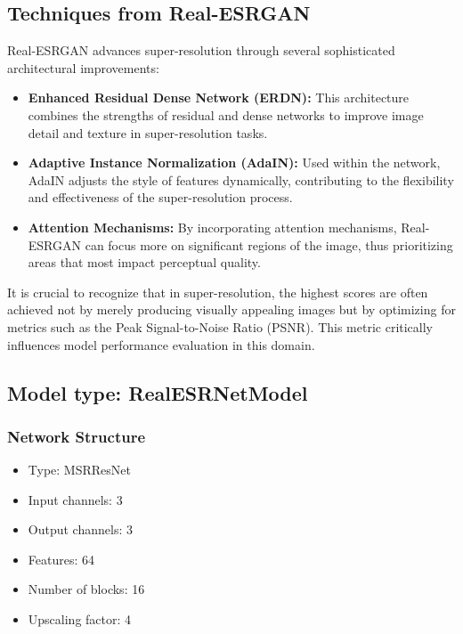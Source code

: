 \documentclass{article}
\begin{document}
\subsection{Techniques from Real-ESRGAN}
\label{subsec:Real-ESRGAN}%

Real-ESRGAN advances super-resolution through several sophisticated architectural improvements:

\begin{itemize}
    \item \textbf{Enhanced Residual Dense Network (ERDN):} This architecture combines the strengths of residual and dense networks to improve image detail and texture in super-resolution tasks.
    \item \textbf{Adaptive Instance Normalization (AdaIN):} Used within the network, AdaIN adjusts the style of features dynamically, contributing to the flexibility and effectiveness of the super-resolution process.
    \item \textbf{Attention Mechanisms:} By incorporating attention mechanisms, Real-ESRGAN can focus more on significant regions of the image, thus prioritizing areas that most impact perceptual quality.
\end{itemize}

It is crucial to recognize that in super-resolution, the highest scores are often achieved not by merely producing visually appealing images but by optimizing for metrics such as the Peak Signal-to-Noise Ratio (PSNR). This metric critically influences model performance evaluation in this domain.

\subsection{Model type: RealESRNetModel}
\label{sec:modelImplementation}%

\subsubsection{Network Structure}
\begin{itemize}
    \item Type: MSRResNet
    \item Input channels: 3
    \item Output channels: 3
    \item Features: 64
    \item Number of blocks: 16
    \item Upscaling factor: 4
\end{itemize}
\end{document}
